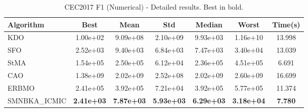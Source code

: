 \begin{table}[H]
\centering\small
\caption{CEC2017 F1 (Numerical) - Detailed results. Best in bold.}
\label{tab:cec2017_F1}
\begin{tabular}{lcccccc}
\toprule
\textbf{Algorithm} & \textbf{Best} & \textbf{Mean} & \textbf{Std} & \textbf{Median} & \textbf{Worst} & \textbf{Time(s)} \\
\midrule
KDO & 1.00e+02 & 9.09e+08 & 2.10e+09 & 9.93e+03 & 1.16e+10 & 13.998 \\
SFO & 2.52e+03 & 9.40e+03 & 6.84e+03 & 7.47e+03 & 3.40e+04 & 13.039 \\
StMA & 1.54e+05 & 2.50e+05 & 6.12e+04 & 2.36e+05 & 4.51e+05 & 6.691 \\
CAO & 1.38e+09 & 2.02e+09 & 2.52e+08 & 2.02e+09 & 2.60e+09 & 16.699 \\
ERBMO & 2.41e+05 & 3.92e+05 & 7.21e+04 & 3.92e+05 & 5.77e+05 & 11.374 \\
SMNBKA_ICMIC & \textbf{2.41e+03} & \textbf{7.87e+03} & \textbf{5.93e+03} & \textbf{6.29e+03} & \textbf{3.18e+04} & \textbf{7.780} \\
\bottomrule
\end{tabular}
\end{table}
